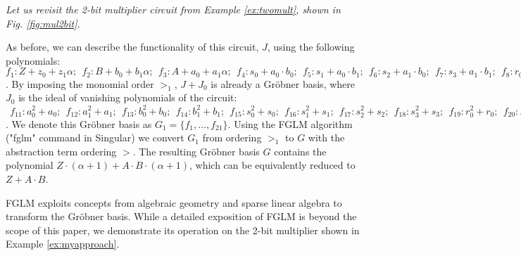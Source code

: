 \begin{Example}
\label{ex:myapproach}
{\it
Let us revisit the 2-bit multiplier circuit from Example \ref{ex:twomult}, 
shown in Fig. \ref{fig:mul2bit}. 
 
As before, we can describe the functionality of this circuit, $J$, using the
following polynomials: $f_1: Z+z_0+z_1\alpha; ~~f_2: B+b_0+b_1\alpha; ~~f_3: A+a_0+a_1 \alpha
; ~~f_4: s_0+a_0 \cdot b_0; ~~f_5: s_1+a_0 \cdot b_1; ~~f_6:
s_2+a_1 \cdot b_0; ~~f_7: s_3+a_1 \cdot b_1; ~~f_8: r_0+s_1 + s_2;
~~f_9: z_0+s_0 + s_3; ~~f_{10}: z_1 + r_0 + s_3$.
By imposing the monomial order $>_1$, $J+J_0$ is already a Gr\"obner basis, 
where $J_0$ is the ideal of vanishing polynomials of the circuit:
$~~f_{11}: a_0^2+a_0; ~~f_{12}: a_1^2+a_1; ~~f_{13}: b_0^2+b_0;
~~f_{14}: b_1^2+b_1; ~~f_{15}: s_0^2+s_0; ~~f_{16}: s_1^2+s_1;
~~f_{17}: s_2^2+s_2; ~~f_{18}: s_3^2+s_3; ~~f_{19}: r_0^2+r_0;
~~f_{20}: z_0^2+z_0; ~~f_{21}: z_1^2+z_1$. We denote this Gr\"obner
basis as $G_1 = \{f_1, \dots, f_{21}\}$. Using the FGLM algorithm 
("fglm" command in  Singular) we convert $G_1$
from ordering $>_1$ to $G$ with the abstraction term ordering $>$. 
The resulting Gr\"obner basis $G$ contains the 
polynomial $Z \cdot (\alpha+1)+A \cdot B \cdot (\alpha+1)$, 
which can be equivalently reduced to $Z+A \cdot B$.
}
\end{Example}

FGLM exploits concepts from algebraic geometry and sparse linear
algebra to transform the Gr\"obner basis. While a detailed exposition
of FGLM is beyond the scope of this paper, we demonstrate its
operation on the 2-bit multiplier shown in Example
\ref{ex:myapproach}.  

